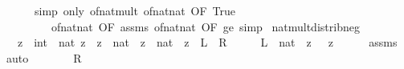 \begin{isabellebody}
\ \ \ \ \ \ {\isacharparenleft}{\kern0pt}simp\ only{\isacharcolon}{\kern0pt}\ of{\isacharunderscore}{\kern0pt}nat{\isacharunderscore}{\kern0pt}mult\ of{\isacharunderscore}{\kern0pt}nat{\isacharunderscore}{\kern0pt}nat\ {\isacharbrackleft}{\kern0pt}OF\ True{\isacharbrackright}{\kern0pt}\isanewline
\ \ \ \ \ \ \ \ \ of{\isacharunderscore}{\kern0pt}nat{\isacharunderscore}{\kern0pt}nat\ {\isacharbrackleft}{\kern0pt}OF\ assms{\isacharbrackright}{\kern0pt}\ of{\isacharunderscore}{\kern0pt}nat{\isacharunderscore}{\kern0pt}nat\ {\isacharbrackleft}{\kern0pt}OF\ ge{\isacharunderscore}{\kern0pt}{}{\isacharbrackright}{\kern0pt}{\isacharcomma}{\kern0pt}\ simp{\isacharparenright}{\kern0pt}\isanewline
{}\isamarkupfalse%
%
\endisatagproof
{\isafoldproof}%
%
\isadelimproof
\isanewline
%
\endisadelimproof
\isanewline
{}\isamarkupfalse%
\ nat{\isacharunderscore}{\kern0pt}mult{\isacharunderscore}{\kern0pt}distrib{\isacharunderscore}{\kern0pt}neg{\isacharcolon}{\kern0pt}\isanewline
\ \ \ {\isachardoublequoteopen}z\ {\isasymle}\ {\isacharparenleft}{\kern0pt}{}{\isacharcolon}{\kern0pt}{\isacharcolon}{\kern0pt}int{\isacharparenright}{\kern0pt}{\isachardoublequoteclose}\ \ {\isachardoublequoteopen}nat\ {\isacharparenleft}{\kern0pt}z\ {\isacharasterisk}{\kern0pt}\ z{\isacharprime}{\kern0pt}{\isacharparenright}{\kern0pt}\ {\isacharequal}{\kern0pt}\ nat\ {\isacharparenleft}{\kern0pt}{\isacharminus}{\kern0pt}\ z{\isacharparenright}{\kern0pt}\ {\isacharasterisk}{\kern0pt}\ nat\ {\isacharparenleft}{\kern0pt}{\isacharminus}{\kern0pt}\ z{\isacharprime}{\kern0pt}{\isacharparenright}{\kern0pt}{\isachardoublequoteclose}\ {\isacharparenleft}{\kern0pt}\ {\isachardoublequoteopen}{\isacharquery}{\kern0pt}L\ {\isacharequal}{\kern0pt}\ {\isacharquery}{\kern0pt}R{\isachardoublequoteclose}{\isacharparenright}{\kern0pt}\isanewline
%
\isadelimproof
%
\endisadelimproof
%
\isatagproof
{}\isamarkupfalse%
\ {\isacharminus}{\kern0pt}\isanewline
\ \ \isamarkupfalse%
\ {\isachardoublequoteopen}{\isacharquery}{\kern0pt}L\ {\isacharequal}{\kern0pt}\ nat\ {\isacharparenleft}{\kern0pt}{\isacharminus}{\kern0pt}\ z\ {\isacharasterisk}{\kern0pt}\ {\isacharminus}{\kern0pt}\ z{\isacharprime}{\kern0pt}{\isacharparenright}{\kern0pt}{\isachardoublequoteclose}\isanewline
\ \ \ \ \isamarkupfalse%
\ assms\ \isamarkupfalse%
\ auto\isanewline
\ \ \isamarkupfalse%
\ \isamarkupfalse%
\ {\isachardoublequoteopen}{\isachardot}{\kern0pt}{\isachardot}{\kern0pt}{\isachardot}{\kern0pt}\ {\isacharequal}{\kern0pt}\ {\isacharquery}{\kern0pt}R{\isachardoublequoteclose}\isanewline

\end{isabellebody}
